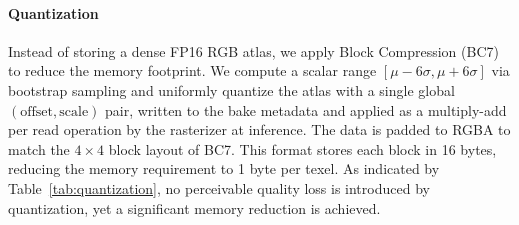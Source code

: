 \documentclass[acmtog,anonymous,review]{acmart}
\begin{document}


\paragraph{\textbf{Quantization}}
Instead of storing a dense FP16 RGB atlas, we apply Block Compression (BC7) to reduce the memory footprint. We compute a scalar range $[\mu - 6\sigma, \mu + 6\sigma]$ via bootstrap sampling and uniformly quantize the atlas with a single global $(\mathrm{offset}, \mathrm{scale})$ pair, written to the bake metadata and applied as a multiply-add per read operation by the rasterizer at inference. The data is padded to RGBA to match the $4 \times 4$ block layout of BC7. This format stores each block in 16 bytes, reducing the memory requirement to 1 byte per texel. As indicated by Table~\ref{tab:quantization}, no perceivable quality loss is introduced by quantization, yet a significant memory reduction is achieved.

\begin{table}[h]
\centering
\caption{Atlas storage formats. Sizes denote bytes per texel and the resulting mean atlas size on the 18 Mip-NeRF 360 splits at $r_{\max}=64$.}
\label{tab:quantization}
\end{table}
\end{document}
